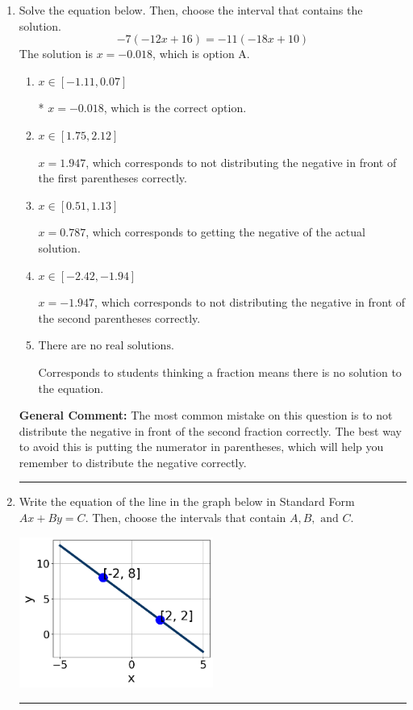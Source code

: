 \documentclass{extbook}[14pt]
\newcommand{\litem}[1]{\item #1

\rule{\textwidth}{0.4pt}}
\begin{document}
\begin{enumerate}\litem{
Solve the equation below. Then, choose the interval that contains the solution.
\[ -7(-12x + 16) = -11(-18x + 10) \]The solution is \( x = -0.018 \), which is option A.\begin{enumerate}[label=\Alph*.]
\item \( x \in [-1.11, 0.07] \)

* $x = -0.018$, which is the correct option.
\item \( x \in [1.75, 2.12] \)

$x = 1.947$, which corresponds to not distributing the negative in front of the first parentheses correctly.
\item \( x \in [0.51, 1.13] \)

$x = 0.787$, which corresponds to getting the negative of the actual solution.
\item \( x \in [-2.42, -1.94] \)

$x = -1.947$, which corresponds to not distributing the negative in front of the second parentheses correctly.
\item \( \text{There are no real solutions.} \)

Corresponds to students thinking a fraction means there is no solution to the equation.
\end{enumerate}

\textbf{General Comment:} The most common mistake on this question is to not distribute the negative in front of the second fraction correctly. The best way to avoid this is putting the numerator in parentheses, which will help you remember to distribute the negative correctly.
}
\litem{
Write the equation of the line in the graph below in Standard Form $Ax+By=C$. Then, choose the intervals that contain $A, B, \text{ and } C$.

\begin{center}
    \includegraphics[width=0.5\textwidth]{../Figures/linearGraphToStandardCopyC.png}
\end{center}


}
\end{enumerate}
\end{document}
